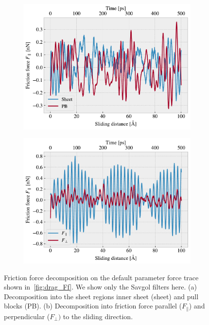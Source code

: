 \begin{figure}[H]
  \centering
  \begin{subfigure}[t]{0.49\textwidth}
    \centering
    \includegraphics[width=\textwidth]{figures/baseline/decomp_group.pdf}
    \caption{}
    \label{fig:decomp_group}
  \end{subfigure}
  \hfill
  \begin{subfigure}[t]{0.49\textwidth}
      \centering
      \includegraphics[width=\textwidth]{figures/baseline/decomp_direc.pdf}
      \caption{}
      \label{fig:decomp_direc}
  \end{subfigure}
  \caption{Friction force decomposition on the default parameter force trace shown in~\cref{fig:drag_Ff}. We show only the Savgol filters here. (a) Decomposition into the sheet regions inner sheet (sheet) and pull blocks (PB). (b) Decomposition into friction force parallel ($F_{\parallel}$) and perpendicular ($F_{\perp})$ to the sliding direction.}
  \label{fig:decomp}
\end{figure}


